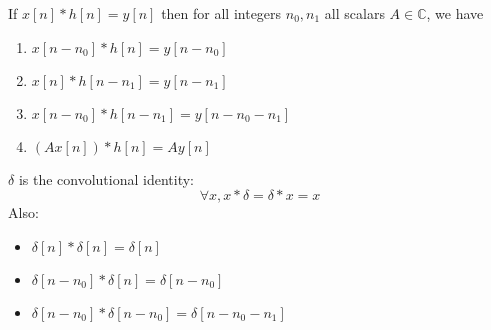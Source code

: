 \begin{corollary}
    If $x[n] * h[n] = y[n]$ then for all integers $n_0, n_1$ all scalars $A \in \mathbb{C}$, we have
    \begin{enumerate}
        \item $x[n - n_0] * h[n] = y[n - n_0]$
        \item $x[n] * h[n -n_1] = y[n - n_1]$
        \item $x[n-n_0] * h[n-n_1] = y[n-n_0-n_1]$
        \item $(A x[n])* h[n] = A y[n]$
    \end{enumerate}
\end{corollary}

\begin{corollary}
    $\delta$ is the convolutional identity:
    $$ \forall x, x * \delta = \delta * x = x$$
    Also:
    \begin{itemize}
        \item $\delta [n] * \delta[n] = \delta [n]$
        \item $\delta [n-n_0] * \delta [n] = \delta [n-n_0]$
        \item $\delta [n-n_0] * \delta[n-n_0] = \delta [n - n_0 - n_1]$
    \end{itemize}
\end{corollary}

